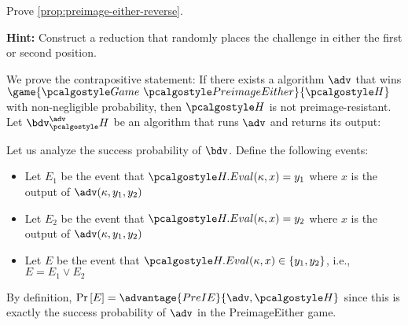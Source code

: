 \begin{exercise}\label{ex:preimage-either-reverse}
  Prove \autoref{prop:preimage-either-reverse}.
  
  \textbf{Hint:} Construct a reduction that randomly places the challenge in either the first or second position.
\end{exercise}

\ifsolutions
\begin{mysolution}
  We prove the contrapositive statement:
  If there exists a \ppt algorithm $\adv$ that wins $\game{\Game~\algo{PreimageEither}}{\algo{H}}$ with non-negligible probability, then $\algo{H}$ is not preimage-resistant.
  Let $\bdv^\adv_\algo{H}$ be an algorithm that runs $\adv$ and returns its output:

  \begin{center}
    \begin{tcolorbox}[width=6cm]
      \begin{pchstack}[center]
      \end{pchstack}
    \end{tcolorbox}
  \end{center}
  
  Let us analyze the success probability of $\bdv$.
  Define the following events:
  \begin{itemize}
    \item Let $E_1$ be the event that $\algo{H.Eval}(\kappa, x) = y_1$ where $x$ is the output of $\adv(\kappa, y_1, y_2)$
    \item Let $E_2$ be the event that $\algo{H.Eval}(\kappa, x) = y_2$ where $x$ is the output of $\adv(\kappa, y_1, y_2)$
    \item Let $E$ be the event that $\algo{H.Eval}(\kappa, x) \in \{y_1, y_2\}$, i.e., $E = E_1 \vee E_2$
  \end{itemize}
  
  By definition, $\pr{E} = \advantage{PreIE}{\adv, \algo{H}}$ since this is exactly the success probability of $\adv$ in the PreimageEither game.
  

\end{mysolution}
